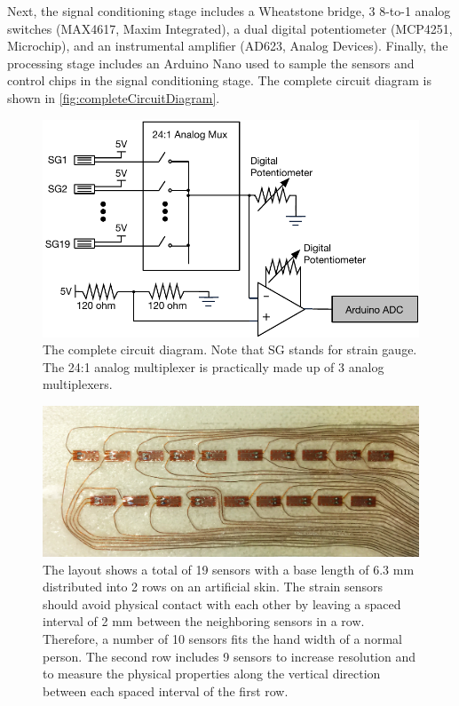 \documentclass{sigchi}
\begin{document}
Next, the signal conditioning stage includes a Wheatstone bridge, 3 8-to-1 analog switches (MAX4617, Maxim Integrated), a dual digital potentiometer (MCP4251, Microchip), and an instrumental amplifier (AD623, Analog Devices). Finally, the processing stage includes an Arduino Nano used to sample the sensors and control chips in the signal conditioning stage. The complete circuit diagram is shown in \autoref{fig:completeCircuitDiagram}.

\begin{figure}
  \includegraphics[width=1\columnwidth]{figures/CompleteDiagram_v2.pdf}
  \caption{The complete circuit diagram. Note that SG stands for strain gauge. The 24:1 analog multiplexer is practically made up of 3 analog multiplexers.}
  \label{fig:completeCircuitDiagram}
\end{figure}

\begin{figure}
 \begin{center}
  \includegraphics[width=1\columnwidth]{figures/tie.png}
  \caption{The layout shows a total of 19 sensors with a base length of 6.3 mm distributed into 2 rows on an artificial skin. The strain sensors should avoid physical contact with each other by leaving a spaced interval of 2 mm between the neighboring sensors in a row. Therefore, a number of 10 sensors fits the hand width of a normal person. The second row includes 9 sensors to increase resolution and to measure the physical properties along the vertical direction between each spaced interval of the first row.}
  \label{fig:tie}
  \end{center}
\end{figure}
\end{document}
